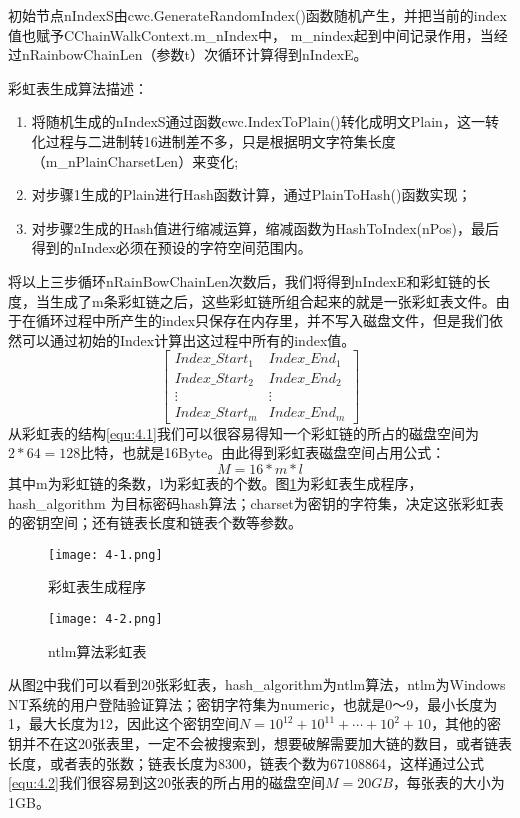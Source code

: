 初始节点nIndexS由cwc.GenerateRandomIndex()函数随机产生，并把当前的index值也赋予CChainWalkContext.m\_nIndex中， m\_nindex起到中间记录作用，当经过nRainbowChainLen（参数t）次循环计算得到nIndexE。

彩虹表生成算法描述：
\begin{enumerate}
\item 将随机生成的nIndexS通过函数cwc.IndexToPlain()转化成明文Plain，这一转化过程与二进制转16进制差不多，只是根据明文字符集长度（m\_nPlainCharsetLen）来变化;
\item 对步骤1生成的Plain进行Hash函数计算，通过PlainToHash()函数实现；
\item 对步骤2生成的Hash值进行缩减运算，缩减函数为HashToIndex(nPos)，最后得到的nIndex必须在预设的字符空间范围内。
\end{enumerate}

将以上三步循环nRainBowChainLen次数后，我们将得到nIndexE和彩虹链的长度，当生成了m条彩虹链之后，这些彩虹链所组合起来的就是一张彩虹表文件。由于在循环过程中所产生的index只保存在内存里，并不写入磁盘文件，但是我们依然可以通过初始的Index计算出这过程中所有的index值。
\begin{equation}
\label{equ:4.1}
\begin{bmatrix}
Index\_Start_1 & Index\_End_1 \\
Index\_Start_2 & Index\_End_2 \\
\vdots  & \vdots \\
Index\_Start_m & Index\_End_m 
\end{bmatrix}
\end{equation}
从彩虹表的结构\eqref{equ:4.1}我们可以很容易得知一个彩虹链的所占的磁盘空间为$2*64=128$比特，也就是16Byte。由此得到彩虹表磁盘空间占用公式：
\begin{equation}
\label{equ:4.2}
M=16*m*l
\end{equation}
其中m为彩虹链的条数，l为彩虹表的个数。图\ref{fig:4.1}为彩虹表生成程序，hash\_algorithm 为目标密码hash算法；charset为密钥的字符集，决定这张彩虹表的密钥空间；还有链表长度和链表个数等参数。
\begin{figure}[!ht]
\centering
\texttt{[image: 4-1.png]}
\caption{彩虹表生成程序}
\label{fig:4.1}
\end{figure}
\begin{figure}[!ht]
\centering
\texttt{[image: 4-2.png]}
\caption{ntlm算法彩虹表}
\label{fig:4.2}
\end{figure}
从图\ref{fig:4.2}中我们可以看到20张彩虹表，hash\_algorithm为ntlm算法，ntlm为Windows NT系统的用户登陆验证算法；密钥字符集为numeric，也就是0～9，最小长度为1，最大长度为12，因此这个密钥空间$N=10^{12}+10^{11}+ \cdots +10^2 +10$，其他的密钥并不在这20张表里，一定不会被搜索到，想要破解需要加大链的数目，或者链表长度，或者表的张数；链表长度为8300，链表个数为67108864，这样通过公式\eqref{equ:4.2}我们很容易到这20张表的所占用的磁盘空间$M=20GB$，每张表的大小为1GB。

